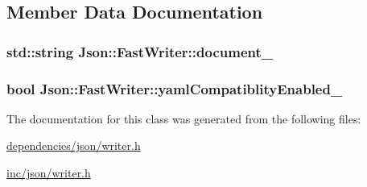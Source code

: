 \subsection{Member Data Documentation}
\hypertarget{classJson_1_1FastWriter_afc70d465b79bfc7741ff75294dcefeab}{
\subsubsection[{document\-\_\-}]{\setlength{\rightskip}{0pt plus 5cm}std\-::string Json\-::\-Fast\-Writer\-::document\-\_\-\hspace{0.3cm}{\ttfamily [private]}}}\label{de/d96/classJson_1_1FastWriter_afc70d465b79bfc7741ff75294dcefeab}
\hypertarget{classJson_1_1FastWriter_a4c4c1911179bf472d24492915b0e489a}{
\subsubsection[{yaml\-Compatiblity\-Enabled\-\_\-}]{\setlength{\rightskip}{0pt plus 5cm}bool Json\-::\-Fast\-Writer\-::yaml\-Compatiblity\-Enabled\-\_\-\hspace{0.3cm}{\ttfamily [private]}}}\label{de/d96/classJson_1_1FastWriter_a4c4c1911179bf472d24492915b0e489a}


The documentation for this class was generated from the following files\-:\begin{DoxyCompactItemize}
\item 
\hyperlink{dependencies_2json_2writer_8h}{dependencies/json/writer.\-h}\item 
\hyperlink{inc_2json_2writer_8h}{inc/json/writer.\-h}\end{DoxyCompactItemize}
